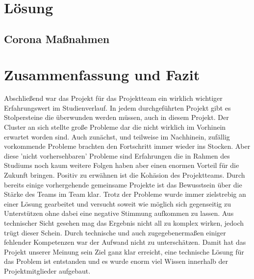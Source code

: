 \documentclass[12pt,oneside,a4paper,parskip]{scrbook}
\begin{document}
\chapter{Lösung}
\section{Corona Maßnahmen}

\chapter{Zusammenfassung und Fazit}
Abschließend war das Projekt f\"ur das Projektteam ein wirklich wichtiger Erfahrungswert im Studienverlauf. In jedem durchgef\"uhrten Projekt gibt es Stolpersteine die \"uberwunden werden m\"ussen, auch in diesem Projekt. Der Cluster an sich stellte große Probleme dar die nicht wirklich im Vorhinein erwartet worden sind. Auch zun\"achst, und teilweise im Nachhinein, zuf\"allig vorkommende Probleme brachten den Fortschritt immer wieder ins Stocken. Aber diese 'nicht vorhersehbaren' Probleme sind Erfahrungen die in Rahmen des Studiums noch kaum weitere Folgen haben aber einen enormen Vorteil f\"ur die Zukunft bringen. \newline
Positiv zu erw\"ahnen ist die Kohäsion des Projektteams. Durch bereits einige vorhergehende gemeinsame Projekte ist das Bewusstsein \"uber die St\"arke des Teams im Team klar. Trotz der Probleme wurde immer zielstrebig an einer L\"osung gearbeitet und versucht soweit wie m\"oglich sich gegenseitig zu Unterst\"utzen ohne dabei eine negative Stimmung aufkommen zu lassen.\newline
Aus technischer Sicht gesehen mag das Ergebnis nicht all zu komplex wirken, jedoch tr\"ugt dieser Schein. Durch technische und auch zugegebenermaßen einiger fehlender Kompetenzen war der Aufwand nicht zu untersch\"atzen. Damit hat das Projekt unserer Meinung sein Ziel ganz klar erreicht, eine technische L\"osung f\"ur das Problem ist entstanden und es wurde enorm viel Wissen innerhalb der Projektmitglieder aufgebaut.

\backmatter

\listoffigures
{}

\listoftables


\cleardoublepage
{}
{}
\printbibliography

\end{document}
